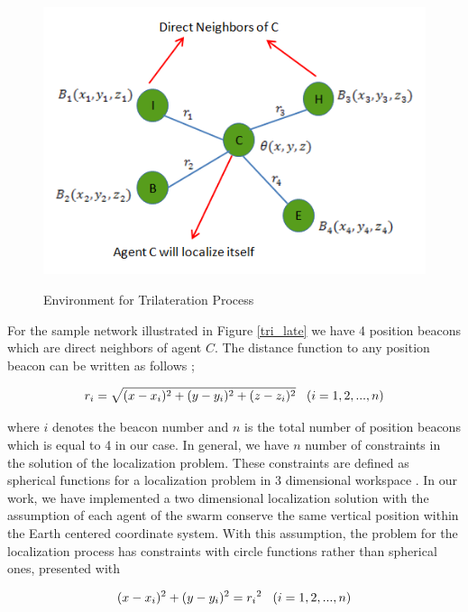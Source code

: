 \begin{figure}[H] 
\caption{Environment for Trilateration Process} \label{tri_late}
\centering
\includegraphics[scale = 0.65]{beacons}
\label{beacons_ref}
\end{figure}

For the sample network illustrated in Figure \ref{tri_late} we have 4 position beacons which are direct neighbors of agent $C$. The distance function to any position beacon can be written as follows \cite{22};

\begin{equation} %
{r_i} = \sqrt{(x-x_i)^2 + (y-y_i)^2+ (z-z_i)^2}    \hspace{0.3cm}   (i=1,2,...,n)
\end{equation}

where $i$ denotes the beacon number and $n$ is the total number of position beacons which is equal to 4 in our case.  In general, we have $n$ number of constraints in the solution of the localization problem. These constraints are defined as spherical functions for a localization problem in 3 dimensional workspace \cite{22}. In our work, we have implemented a two dimensional localization solution with the assumption of each agent of the swarm conserve the same vertical position within the Earth centered coordinate system. With this assumption, the problem for the localization process has constraints with circle functions rather than spherical ones, presented with

\begin{equation}
(x-x_i)^2 + (y - y_i)^2 = {r_i}^2 \hspace{0.3cm}   (i=1,2,...,n)
\end{equation}

